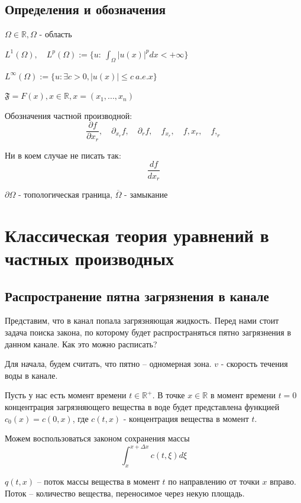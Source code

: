\documentclass[12pt]{report}
\begin{document}
\tableofcontents

\section{Определения и обозначения}

$\Omega \in \mathbb{R}, \Omega$ - область

$L^1(\Omega), \quad L^p(\Omega) := \{ u: \: \int_{\Omega}|u(x)|^pdx < + \infty\}$

$L^\infty(\Omega) := \{ u: \exists c > 0, |u(x)| \le c \: a.e. x \}$

$\mathfrak{F} = F(x), x \in \mathbb{R}, x = (x_1, ..., x_n)$

Обозначения частной производной: 
$$
    \frac{\partial f}{\partial x_r}, \quad \partial_{x_r}f, \quad \partial_rf, \quad f_{x_r}, \quad f,x_r, \quad f, _r
$$

Ни в коем случае не писать так: 
$$
    \frac{df}{dx_r}
$$

$\partial \Omega$ - топологическая граница, $\overline{\Omega}$ - замыкание


\chapter{Классическая теория уравнений в частных производных}

\section{Распространение пятна загрязнения в канале}

Представим, что в канал попала загрязняющая жидкость. Перед нами стоит задача поиска закона,
по которому будет распространяться пятно загрязнения в данном канале. 
Как это можно расписать? 

Для начала, будем считать, что пятно -- одномерная зона. $v$ - скорость течения воды в канале. 

Пусть у нас есть момент времени $t \in \mathbb{R^+}$. В точке $x \in \mathbb{R}$ в момент времени $t = 0$ концентрация загрязняющего вещества в воде будет представлена функцией $c_0(x) = c(0, x)$, где $c(t,x)$ - концентрация вещества в момент $t$.

Можем воспользоваться законом сохранения массы
$$
    \int^{x + \Delta x}_{x}{c(t, \xi)d\xi}
$$

$q(t,x)$ -- поток массы вещества в момент $t$ по направлению от точки $x$ вправо. Поток -- количество вещества, переносимое через некую площадь.
\end{document}
